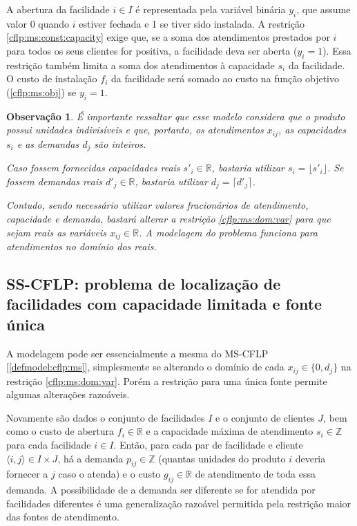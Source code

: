 \documentclass[]{article}
\newtheorem{observation}{Observação}
\begin{document}
			A abertura da facilidade $i \in I$ é representada pela variável binária $y_i$, que assume valor 0 quando $i$ estiver fechada e 1 se tiver sido instalada.
			A restrição \ref{cflp:ms:const:capacity} exige que, se a soma dos atendimentos prestados por $i$ para todos os seus clientes for positiva, a facilidade deva ser aberta ($y_i = 1$). 
			Essa restrição também limita a soma dos atendimentos à capacidade $s_i$ da facilidade.
			O custo de instalação $f_i$ da facilidade será somado ao custo na função objetivo (\ref{cflp:ms:obj}) se $y_i = 1$.  
	 
	 		\begin{observation} \label{cflp:ms:obs:int}
	 			É importante ressaltar que esse modelo considera que o produto possui unidades indivisíveis e que, portanto, os atendimentos $x_{ij}$, as capacidades $s_i$ e as demandas $d_j$ são inteiros. 
	 			
	 			Caso fossem fornecidas capacidades reais $s'_i \in \mathbb{R}$, bastaria utilizar $s_i = \lfloor s'_i \rfloor$. 
	 			Se fossem demandas reais $d'_j \in \mathbb{R}$, bastaria utilizar $d_j = \lceil d'_j \rceil$. 
	 			
	 			Contudo, sendo necessário utilizar valores fracionários de atendimento, capacidade e demanda, bastará alterar a restrição \ref{cflp:ms:dom:var} para que sejam reais as variáveis $x_{ij} \in \mathbb{R}$. 
	 			A modelagem do problema funciona para atendimentos no domínio dos reais. 
	 		\end{observation} 		 			
	 		
	 	\subsection{SS-CFLP: problema de localização de facilidades com capacidade limitada e fonte única} \label{defmodel:cflp:ss}		
	 		
	 		A modelagem pode ser essencialmente a mesma do MS-CFLP [\ref{defmodel:cflp:ms}], simplesmente se alterando o domínio de cada $x_{ij} \in \{ 0, d_j \}$ na restrição \ref{cflp:ms:dom:var}. 
	 		Porém a restrição para uma única fonte permite algumas alterações razoáveis.
	 		
	 		Novamente são dados o conjunto de facilidades $I$ e o conjunto de clientes $J$, bem como o custo de abertura $f_i \in \mathbb{R}$ e a capacidade máxima de atendimento $s_i \in \mathbb{Z}$ para cada facilidade $i \in I$. 
	 		Então, para cada par de facilidade e cliente $\langle i, j \rangle \in I \times J$, há a demanda $p_{ij} \in \mathbb{Z}$ (quantas unidades do produto $i$ deveria fornecer a $j$ caso o atenda) e o custo $g_{ij} \in \mathbb{R}$ de atendimento de toda essa demanda.  	 		
	 		A possibilidade de a demanda ser diferente se for atendida por facilidades diferentes é uma generalização razoável permitida pela restrição maior das fontes de atendimento.
	 		
\end{document}
